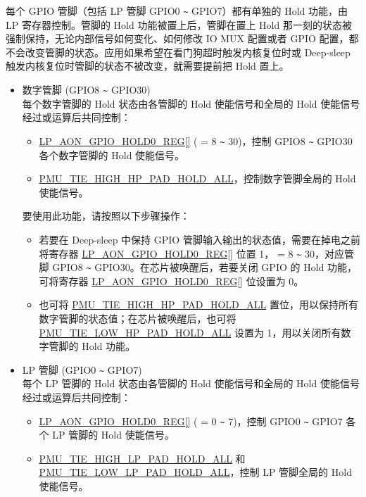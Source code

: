 \documentclass[main\_\_CN.tex]{subfiles}
\begin{document}
每个 GPIO 管脚（包括 LP 管脚 GPIO0 \verb+~+ GPIO7）都有单独的 Hold 功能，由 LP 寄存器控制。管脚的 Hold 功能被置上后，管脚在置上 Hold 那一刻的状态被强制保持，无论内部信号如何变化、如何修改 IO MUX 配置或者 GPIO 配置，都不会改变管脚的状态。应用如果希望在看门狗超时触发内核复位时或 Deep-sleep 触发内核复位时管脚的状态不被改变，就需要提前把 Hold 置上。

\begin{itemize}
\item 数字管脚 (GPIO8 \verb+~+ GPIO30)\\ 
每个数字管脚的 Hold 状态由各管脚的 Hold 使能信号和全局的 Hold 使能信号经过或运算后共同控制：
\begin{itemize}
    \item \hyperref[regdesc:LPAONGPIOHOLD0REG]{LP\_AON\_GPIO\_HOLD0\_REG[]} ( = 8 \verb+~+ 30)，控制 GPIO8 \verb+~+ GPIO30 各个数字管脚的 Hold 使能信号。
    \item \hyperref[fielddesc:PMUTIEHIGHHPPADHOLDALL]{PMU\_TIE\_HIGH\_HP\_PAD\_HOLD\_ALL}，控制数字管脚全局的 Hold 使能信号。
\end{itemize}

要使用此功能，请按照以下步骤操作：
\begin{itemize}
    \item 若要在 Deep-sleep 中保持 GPIO 管脚输入输出的状态值，需要在掉电之前将寄存器 \hyperref[regdesc:LPAONGPIOHOLD0REG]{LP\_AON\_GPIO\_HOLD0\_REG[]} 位置 1， = 8 \verb+~+ 30，对应管脚 GPIO8 \verb+~+ GPIO30。在芯片被唤醒后，若要关闭 GPIO 的 Hold 功能，可将寄存器 \hyperref[regdesc:LPAONGPIOHOLD0REG]{LP\_AON\_GPIO\_HOLD0\_REG[]} 位设置为 0。
    \item 也可将 \hyperref[fielddesc:PMUTIEHIGHHPPADHOLDALL]{PMU\_TIE\_HIGH\_HP\_PAD\_HOLD\_ALL} 置位，用以保持所有数字管脚的状态值；在芯片被唤醒后，也可将 \hyperref[fielddesc:PMUTIELOWHPPADHOLDALL]{PMU\_TIE\_LOW\_HP\_PAD\_HOLD\_ALL} 设置为 1，用以关闭所有数字管脚的 Hold 功能。
    \end{itemize}
\item LP 管脚 (GPIO0 \verb+~+ GPIO7)\\
每个 LP 管脚的 Hold 状态由各管脚的 Hold 使能信号和全局的 Hold 使能信号经过或运算后共同控制：
\begin{itemize}
    \item \hyperref[regdesc:LPAONGPIOHOLD0REG]{LP\_AON\_GPIO\_HOLD0\_REG[]} ( = 0 \verb+~+ 7)，控制 GPIO0 \verb+~+ GPIO7 各个 LP 管脚的 Hold 使能信号。
    \item \hyperref[fielddesc:PMUTIEHIGHLPPADHOLDALL]{PMU\_TIE\_HIGH\_LP\_PAD\_HOLD\_ALL} 和 \hyperref[fielddesc:PMUTIELOWLPPADHOLDALL]{PMU\_TIE\_LOW\_LP\_PAD\_HOLD\_ALL}，控制 LP 管脚全局的 Hold 使能信号。
\end{itemize}


\end{itemize}
\end{document}
